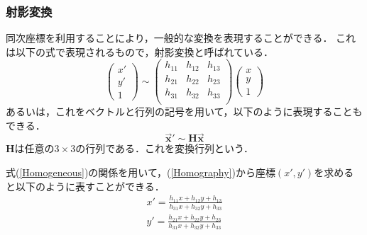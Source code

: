 \documentclass[openright]{nitocs}
\numberwithin{equation}{section}
\begin{document}
            \subsubsection{射影変換}
                同次座標を利用することにより，一般的な変換を表現することができる．
                これは以下の式で表現されるもので，射影変換と呼ばれている\cite{DIP}．
                \begin{equation} %
                    \left(
                        \begin{array}{ccc}
                        x'\\
                        y'\\
                        1
                        \end{array}
                    \right)\sim
                    \left(
                        \begin{array}{ccc}
                        h_{11} & h_{12} & h_{13}\\
                        h_{21} & h_{22} & h_{23}\\
                        h_{31} & h_{32} & h_{33}\\
                        \end{array}
                    \right)
                    \left(
                        \begin{array}{ccc}
                        x\\
                        y\\
                        1
                        \end{array}
                    \right)
                    \label{Homography}
                \end{equation}
                あるいは，これをベクトルと行列の記号を用いて，以下のように表現することもできる．
                \begin{equation} %
                    \bm{\vec{x}'} \sim \bm{H\vec{x}}
                \end{equation}
                $\bm{H}$は任意の$3\times3$の行列である．これを変換行列という．

                式(\ref{Homogeneous})の関係を用いて，(\ref{Homography})から座標$(x',y')$を求めると以下のように表すことができる．
                \begin{equation} %
                    \begin{split} %
                        x' = \frac{h_{11}x+h_{12}y+h_{13}}{h_{31}x+h_{32}y+h_{33}} \\ 
                        y' = \frac{h_{21}x+h_{22}y+h_{23}}{h_{31}x+h_{32}y+h_{33}} \\ 
                    \end{split}
                    \label{transform_XY}
                \end{equation}
\end{document}
